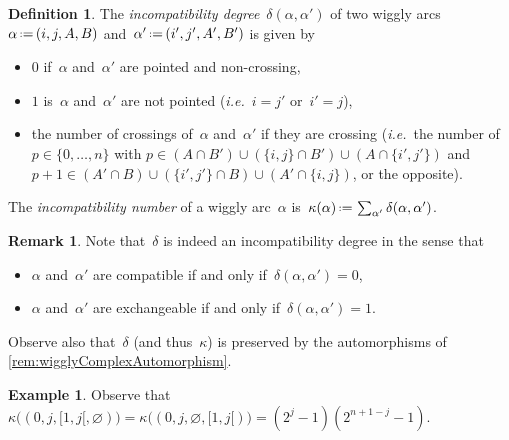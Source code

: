 \documentclass{amsart}
\theoremstyle{definition}
\newtheorem{definition}[theorem]{Definition}
\newtheorem{example}[theorem]{Example}
\newtheorem{remark}[theorem]{Remark}
\renewcommand{\b}[1]{{\boldsymbol{#1}}} %
\newcommand{\eqdef}{\mbox{\,\raisebox{0.2ex}{\scriptsize\ensuremath{\mathrm:}}\ensuremath{=}\,}} %
\newcommand{\ie}{\textit{i.e.}~} %
\newcommand{\darkblue}{\color{darkblue}} %
\newcommand{\defn}[1]{\textsl{\darkblue #1}} %
\newcommand{\vincent}[1]{\todo[color=blue!30]{\rm #1 \\ \hfill --- V.}}
\begin{document}
\begin{definition}
\label{def:incompatibilityDegree}
The \defn{incompatibility degree}~$\delta(\alpha, \alpha')$ of two wiggly arcs~$\alpha \eqdef (i, j, A, B)$ and~$\alpha' \eqdef (i', j', A', B')$ is given by
\begin{itemize}
\item $0$ if~$\alpha$ and~$\alpha'$ are pointed and non-crossing,
\item $1$ is~$\alpha$ and~$\alpha'$ are not pointed (\ie $i = j'$ or~$i' = j$),
\item the number of crossings of~$\alpha$ and~$\alpha'$ if they are crossing (\ie the number of~$p \in \{0, \dots, n\}$ with $p \in (A \cap B') \cup (\{i,j\} \cap B') \cup (A \cap \{i',j'\})$ and~$p+1 \in (A' \cap B) \cup (\{i',j'\} \cap B) \cup (A' \cap \{i,j\})$, or the opposite).
\end{itemize}
The \defn{incompatibility number} of a wiggly arc~$\alpha$ is~$\kappa(\alpha) \eqdef \sum_{\alpha'} \delta(\alpha, \alpha')$.
\end{definition}

\begin{remark}\label{rem:incompatibility-deg}
Note that~$\delta$ is indeed an incompatibility degree in the sense that
\begin{itemize}
\item $\alpha$ and~$\alpha'$ are compatible if and only if~$\delta(\alpha, \alpha') = 0$,
\item $\alpha$ and~$\alpha'$ are exchangeable if and only if~$\delta(\alpha, \alpha') = 1$.
\end{itemize}
Observe also that~$\delta$ (and thus~$\kappa$) is preserved by the automorphisms of \cref{rem:wigglyComplexAutomorphism}.
\end{remark}


\begin{example}
Observe that
$\kappa \big( (0, j, {[1,j[}, \varnothing) \big) 
= \kappa \big( (0, j, \varnothing, {[1,j[}) \big) 
= (2^j-1)(2^{n+1-j}-1)$.
\end{example}
\end{document}
